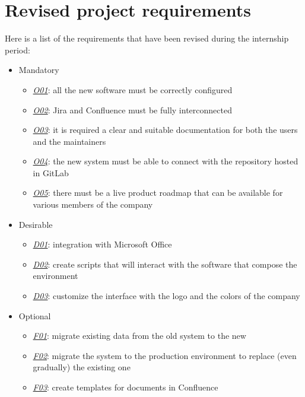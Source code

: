 \section{Revised project requirements}
	Here is a list of the requirements that have been revised during the internship period:
	\begin{itemize}
		\item Mandatory
		\begin{itemize}
			\item \underline{\textit{O01}}: all the new software must be correctly configured
			\item \underline{\textit{O02}}: Jira and Confluence must be fully interconnected
			\item \underline{\textit{O03}}: it is required a clear and suitable documentation for both the users and the maintainers
			\item \underline{\textit{O04}}: the new system must be able to connect with the repository hosted in GitLab
			\item \underline{\textit{O05}}: there must be a live product roadmap that can be available for various members of the company
		\end{itemize}
		\item Desirable
		\begin{itemize}
			\item \underline{\textit{D01}}: integration with Microsoft Office
			\item \underline{\textit{D02}}: create scripts that will interact with the software that compose the environment
			\item \underline{\textit{D03}}: customize the interface with the logo and the colors of the company
		\end{itemize}
		\item Optional
		\begin{itemize}
			\item \underline{\textit{F01}}: migrate existing data from the old system to the new
			\item \underline{\textit{F02}}: migrate the system to the production environment to replace (even gradually) the existing one
			\item \underline{\textit{F03}}: create templates for documents in Confluence
		\end{itemize} 
	\end{itemize}